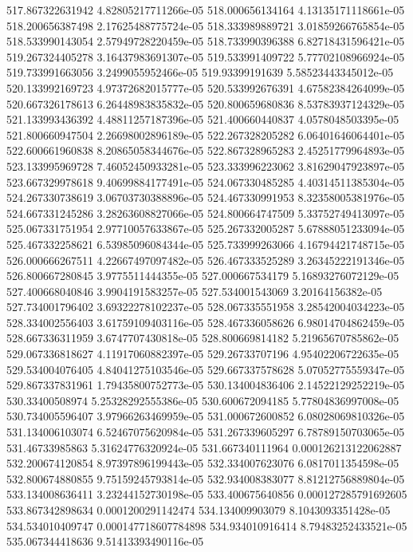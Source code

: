{517.867322631942 4.82805217711266e-05
518.000656134164 4.13135171118661e-05
518.200656387498 2.17625488775724e-05
518.333989889721 3.01859266765854e-05
518.533990143054 2.57949728220459e-05
518.733990396388 6.82718431596421e-05
519.267324405278 3.16437983691307e-05
519.533991409722 5.77702108966924e-05
519.733991663056 3.2499055952466e-05
519.93399191639 5.58523443345012e-05
520.133992169723 4.97372682015777e-05
520.533992676391 4.67582384264099e-05
520.667326178613 6.26448983835832e-05
520.800659680836 8.53783937124329e-05
521.133993436392 4.48811257187396e-05
521.400660440837 4.0578048503395e-05
521.800660947504 2.26698002896189e-05
522.267328205282 6.06401646064401e-05
522.600661960838 8.20865058344676e-05
522.867328965283 2.45251779964893e-05
523.133995969728 7.46052450933281e-05
523.333996223062 3.81629047923897e-05
523.667329978618 9.40699884177491e-05
524.067330485285 4.40314511385304e-05
524.267330738619 3.06703730388896e-05
524.467330991953 8.32358005381976e-05
524.667331245286 3.28263608827066e-05
524.800664747509 5.33752749413097e-05
525.067331751954 2.97710057633867e-05
525.267332005287 5.67888051233094e-05
525.467332258621 6.53985096084344e-05
525.733999263066 4.16794421748715e-05
526.000666267511 4.22667497097482e-05
526.467333525289 3.26345222191346e-05
526.800667280845 3.9775511444355e-05
527.000667534179 5.16893276072129e-05
527.400668040846 3.9904191583257e-05
527.534001543069 3.20164156382e-05
527.734001796402 3.69322278102237e-05
528.067335551958 3.28542004034223e-05
528.334002556403 3.61759109403116e-05
528.467336058626 6.98014704862459e-05
528.667336311959 3.6747707430818e-05
528.800669814182 5.21965670785862e-05
529.067336818627 4.11917060882397e-05
529.26733707196 4.95402206722635e-05
529.534004076405 4.84041275103546e-05
529.667337578628 5.07052775559347e-05
529.867337831961 1.79435800752773e-05
530.134004836406 2.14522129252219e-05
530.33400508974 5.25328292555386e-05
530.600672094185 5.77804836997008e-05
530.734005596407 3.97966263469959e-05
531.000672600852 6.08028069810326e-05
531.134006103074 6.52467075620984e-05
531.267339605297 6.78789150703065e-05
531.46733985863 5.31624776320924e-05
531.667340111964 0.000126213122062887
532.200674120854 8.97397896199443e-05
532.334007623076 6.0817011354598e-05
532.800674880855 9.75159245793814e-05
532.934008383077 8.81212756889804e-05
533.134008636411 3.23244152730198e-05
533.400675640856 0.000127285791692605
533.867342898634 0.0001200291142474
534.134009903079 8.1043093351428e-05
534.534010409747 0.000147718607784898
534.934010916414 8.79483252433521e-05
535.067344418636 9.51413393490116e-05
}
